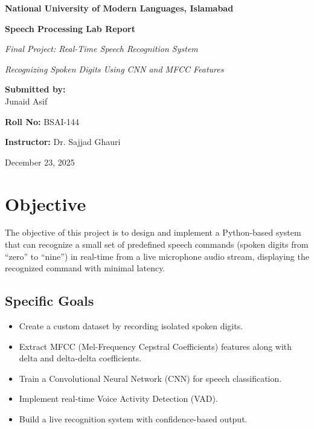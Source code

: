 \documentclass[a4paper,12pt]{article}
\begin{document}
\begin{titlepage}
    \centering
    {\Large \textbf{National University of Modern Languages, Islamabad}} \par
    \vspace{2cm}
    {\Huge \bfseries Speech Processing Lab Report \par}
    \vspace{2cm}
    {\Large \textit{Final Project: Real-Time Speech Recognition System} \par}
    \vspace{0.5cm}
    {\large \textit{Recognizing Spoken Digits Using CNN and MFCC Features} \par}
    \vspace{3cm}
    {\large \textbf{Submitted by:} \\ Junaid Asif} \par
    \vspace{0.3cm}
    {\large \textbf{Roll No:} BSAI-144} \par
    \vspace{0.3cm}
    {\large \textbf{Instructor:} Dr. Sajjad Ghauri} \par
    \vfill
    {\large December 23, 2025}
\end{titlepage}


\tableofcontents
\newpage

\section{Objective}
The objective of this project is to design and implement a Python-based system that can recognize a small set of predefined speech commands (spoken digits from ``zero'' to ``nine'') in real-time from a live microphone audio stream, displaying the recognized command with minimal latency.

\subsection{Specific Goals}
\begin{itemize}
    \item Create a custom dataset by recording isolated spoken digits.
    \item Extract MFCC (Mel-Frequency Cepstral Coefficients) features along with delta and delta-delta coefficients.
    \item Train a Convolutional Neural Network (CNN) for speech classification.
    \item Implement real-time Voice Activity Detection (VAD).
    \item Build a live recognition system with confidence-based output.
\end{itemize}
\end{document}

